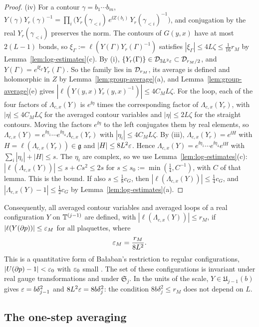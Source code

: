\begin{proof}
(iv) For a contour $\gamma=b_1\cdots b_m$, $Y(\gamma)Y_r(\gamma)^{-1}=\prod_i\big(Y_r(\gamma_{<i})\,e^{\ii Z(b_i)}\,Y_r(\gamma_{<i})^{-1}\big)$, and conjugation by the real $Y_r(\gamma_{<i})$ preserves the norm. The contours of $G(y,x)$ have at most $2(L-1)$ bonds, so $\xi_\Gamma:=\ell(Y(\Gamma)Y_r(\Gamma)^{-1})$ satisfies $|\xi_\Gamma|\le4L\zeta\le\frac1{16}r_M$ by Lemma~\ref{lem:log-estimates}(c). By (i), $\{Y_r(\Gamma)\}\in\mathcal D_{3L^2\varepsilon}\subset\mathcal D_{r_M/2}$, and $Y(\Gamma)=e^{\ii\xi_\Gamma}Y_r(\Gamma)$. So the family lies in $\mathcal D_{r_M}$, its average is defined and holomorphic in $Z$ by Lemma~\ref{lem:group-average}(a), and Lemma~\ref{lem:group-average}(e) gives $|\ell(Y(y,x)Y_r(y,x)^{-1})|\le4C_ML\zeta$. For the loop, each of the four factors of $\Lambda_{c,x}(Y)$ is $e^{\ii\eta}$ times the corresponding factor of $\Lambda_{c,x}(Y_r)$, with $|\eta|\le4C_ML\zeta$ for the averaged contour variables and $|\eta|\le2L\zeta$ for the straight contours. Moving the factors $e^{\ii\eta}$ to the left conjugates them by real elements, so $\Lambda_{c,x}(Y)=e^{\ii\eta_1}\cdots e^{\ii\eta_4}\Lambda_{c,x}(Y_r)$ with $|\eta_i|\le4C_ML\zeta$. By (iii), $\Lambda_{c,x}(Y_r)=e^{\ii H}$ with $H=\ell(\Lambda_{c,x}(Y_r))\in\mathfrak g$ and $|H|\le8L^2\varepsilon$. Hence $\Lambda_{c,x}(Y)=e^{\ii\eta_1}\cdots e^{\ii\eta_4}e^{\ii H}$ with $\sum_i|\eta_i|+|H|\le s$. The $\eta_i$ are complex, so we use Lemma~\ref{lem:log-estimates}(c): $|\ell(\Lambda_{c,x}(Y))|\le s+Cs^2\le2s$ for $s\le s_0:=\min(\frac14,C^{-1})$, with $C$ of that lemma. This is the bound. If also $s\le\frac18c_G$, then $|\ell(\Lambda_{c,x}(Y))|\le\frac14c_G$, and $|\Lambda_{c,x}(Y)-1|\le\frac12c_G$ by Lemma~\ref{lem:log-estimates}(a).
\end{proof}

Consequently, all averaged contour variables and averaged loops of a real configuration $Y$ on $\mathbb T^{(j-1)}$ are defined, with $|\ell(\Lambda_{c,x}(Y))|\le r_M$, if $|\ell(Y(\partial p))|\le\varepsilon_M$ for all plaquettes, where
\[
\varepsilon_M=\frac{r_M}{8L^2} .
\]
This is a quantitative form of Ba\l aban's restriction to regular configurations, $|U(\partial p)-1|<\varepsilon_0$ with $\varepsilon_0$ small \cite[p.~254]{BalYM4I}. The set of these configurations is invariant under real gauge transformations and under $\mathfrak S_j$. In the units of the scale, $Y\in\mathfrak U_{j-1}(b)$ gives $\varepsilon=b\delta_{j-1}^2$ and $8L^2\varepsilon=8b\delta_j^2$: the condition $8b\delta_j^2\le r_M$ does not depend on $L$.

\subsection{The one-step averaging}\label{ss:21.5}

